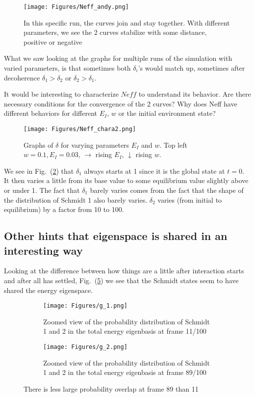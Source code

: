 \documentclass{article}
\begin{document}
\begin{figure}[h]
    \centering
    \texttt{[image: Figures/Neff\_andy.png]}
    \caption{In this specific run, the curves join and stay together. With different parameters, we see the 2 curves stabilize with some distance, positive or negative}
    \label{fig:Neff_andy}
\end{figure}

What we saw looking at the graphs for multiple runs of the simulation with varied parameters, is that sometimes both $\delta_i$'s would match up, sometimes after decoherence $\delta_1>\delta_2$ or $\delta_2>\delta_1$.

It would be interesting to characterize $Neff$ to understand its behavior. Are there necessary conditions for the convergence of the 2 curves? Why does Neff have different behaviors for different $E_I$, $w$ or the initial environment state? 

\begin{figure}[h]
    \centering
    \texttt{[image: Figures/Neff\_chara2.png]}
    \caption{Graphs of $\delta$ for varying parameters $E_I$ and $w$. Top left $w=0.1, E_I=0.03$, $\rightarrow$ rising $E_I$, $\downarrow$ rising $w$.}
    \label{fig:characteriazation_Neff}
\end{figure}


We see in Fig.~(\ref{fig:characteriazation_Neff}) that $\delta_1$ always starts at 1 since it is the global state at $t=0$. It then varies a little from its base value to some equilibrium value slightly above or under 1. The fact that $\delta_1$ barely varies comes from the fact that the shape of the distribution of Schmidt 1 also barely varies. $\delta_2$ varies (from initial to equilibrium) by a factor from 10 to 100.

\subsection{Other hints that eigenspace is shared in an interesting way}

Looking at the difference between how things are a little after interaction starts and after all has settled, Fig.~(\ref{fig:gif_compare}) we see that the Schmidt states seem to have shared the energy eigenspace.

\begin{figure}[h!]
  \centering
  \begin{subfigure}[b]{0.4\linewidth}
    \texttt{[image: Figures/g\_1.png]}
    \caption{Zoomed view of the probability distribution of Schmidt 1 and 2 in the total energy eigenbasis at frame 11/100}
    \label{fig:1}
  \end{subfigure}
  \begin{subfigure}[b]{0.4\linewidth}
    \texttt{[image: Figures/g\_2.png]}
    \caption{Zoomed view of the probability distribution of Schmidt 1 and 2 in the total energy eigenbasis at frame 89/100}
    \label{fig:2}
  \end{subfigure}
  \caption{There is less large probability overlap at frame 89 than 11}
  \label{fig:gif_compare}
\end{figure}
\end{document}
